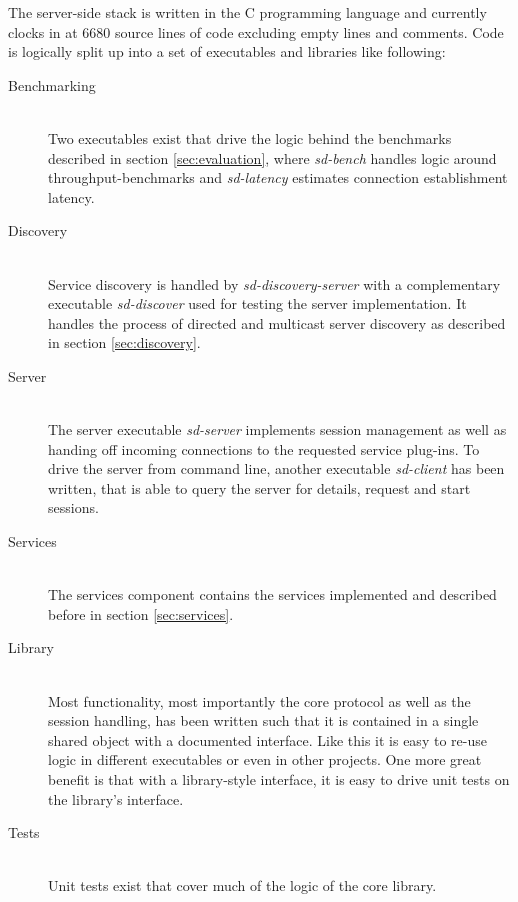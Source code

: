 The server-side stack is written in the C programming language and currently clocks in at 6680 source lines of code excluding empty lines and comments.
Code is logically split up into a set of executables and libraries like following:
\begin{description}
    \item[Benchmarking]\hfill\\
        Two executables exist that drive the logic behind the benchmarks described in section \ref{sec:evaluation}, where \emph{sd-bench} handles logic around throughput-benchmarks and \emph{sd-latency} estimates connection establishment latency.
    \item[Discovery]\hfill\\
        Service discovery is handled by \emph{sd-discovery-server} with a complementary executable \emph{sd-discover} used for testing the server implementation.
        It handles the process of directed and multicast server discovery as described in section \ref{sec:discovery}.
    \item[Server]\hfill\\
        The server executable \emph{sd-server} implements session management as well as handing off incoming connections to the requested service plug-ins.
        To drive the server from command line, another executable \emph{sd-client} has been written, that is able to query the server for details, request and start sessions.
    \item[Services]\hfill\\
        The services component contains the services implemented and described before in section \ref{sec:services}.
    \item[Library]\hfill\\
        Most functionality, most importantly the core protocol as well as the session handling, has been written such that it is contained in a single shared object with a documented interface.
        Like this it is easy to re-use logic in different executables or even in other projects.
        One more great benefit is that with a library-style interface, it is easy to drive unit tests on the library's interface.
    \item[Tests]\hfill\\
        Unit tests exist that cover much of the logic of the core library.
\end{description}

